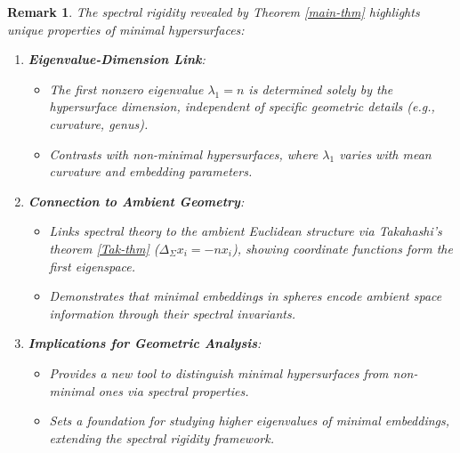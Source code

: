 \documentclass[a4, 12pt]{amsart}
\numberwithin{equation}{section} \numberwithin{equation}{section}
\newtheorem{rem}{Remark}[section]{\bfseries\upshape}
\begin{document}
\begin{rem}
The spectral rigidity revealed by Theorem \ref{main-thm} highlights unique properties of minimal hypersurfaces:

\begin{enumerate}
    \item \textbf{Eigenvalue-Dimension Link}:
    \begin{itemize}
        \item[(i)] The first nonzero eigenvalue $\lambda_1 = n$ is determined solely by the hypersurface dimension, independent of specific geometric details (e.g., curvature, genus).
        \item[(ii)] Contrasts with non-minimal hypersurfaces, where $\lambda_1$ varies with mean curvature and embedding parameters.
    \end{itemize}

    \item \textbf{Connection to Ambient Geometry}:
    \begin{itemize}
        \item[(i)] Links spectral theory to the ambient Euclidean structure via Takahashi's theorem \ref{Tak-thm} ($\Delta_\Sigma x_i = -n x_i$), showing coordinate functions form the first eigenspace.
        \item[(ii)] Demonstrates that minimal embeddings in spheres encode ambient space information through their spectral invariants.
    \end{itemize}

    \item \textbf{Implications for Geometric Analysis}:
    \begin{itemize}
        \item[(i)] Provides a new tool to distinguish minimal hypersurfaces from non-minimal ones via spectral properties.
       \item[(ii)] Sets a foundation for studying higher eigenvalues of minimal embeddings, extending the spectral rigidity framework.
    \end{itemize}
\end{enumerate}
\end{rem}
\end{document}
